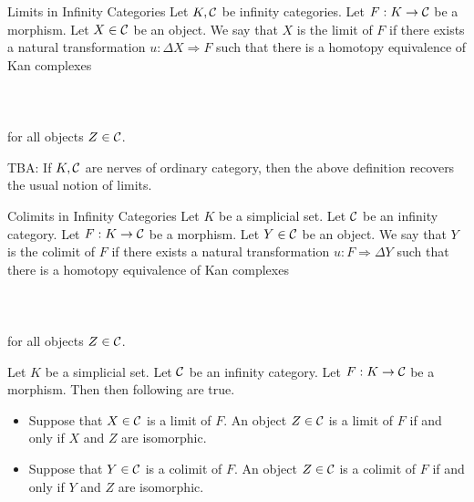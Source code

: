 \documentclass[a4paper]{article}
\begin{document}
\begin{defn}{Limits in Infinity Categories}{} Let $K,\mathcal{C}$ be infinity categories. Let $F:K\to\mathcal{C}$ be a morphism. Let $X\in\mathcal{C}$ be an object. We say that $X$ is the limit of $F$ if there exists a natural transformation $u:\Delta X\Rightarrow F$ such that there is a homotopy equivalence of Kan complexes \\~\\
\\~\\
for all objects $Z\in\mathcal{C}$. 
\end{defn}

TBA: If $K,\mathcal{C}$ are nerves of ordinary category, then the above definition recovers the usual notion of limits. 

\begin{defn}{Colimits in Infinity Categories}{} Let $K$ be a simplicial set. Let $\mathcal{C}$ be an infinity category. Let $F:K\to\mathcal{C}$ be a morphism. Let $Y\in\mathcal{C}$ be an object. We say that $Y$ is the colimit of $F$ if there exists a natural transformation $u:F\Rightarrow\Delta Y$ such that there is a homotopy equivalence of Kan complexes \\~\\
\\~\\
for all objects $Z\in\mathcal{C}$. 
\end{defn}

\begin{prp}{}{} Let $K$ be a simplicial set. Let $\mathcal{C}$ be an infinity category. Let $F:K\to\mathcal{C}$ be a morphism. Then then following are true. 
\begin{itemize}
\item Suppose that $X\in\mathcal{C}$ is a limit of $F$. An object $Z\in\mathcal{C}$ is a limit of $F$ if and only if $X$ and $Z$ are isomorphic. 
\item Suppose that $Y\in\mathcal{C}$ is a colimit of $F$. An object $Z\in\mathcal{C}$ is a colimit of $F$ if and only if $Y$ and $Z$ are isomorphic. 
\end{itemize}
\end{prp}
\end{document}
